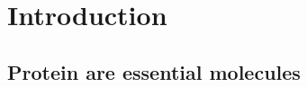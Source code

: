 \documentclass[11pt, b5paper,twoside]{tesi_upf}
\begin{document}




















\mainmatter








\section*{Introduction} \label{introduction} 
\subsection{Protein are essential molecules}
\end{document}
